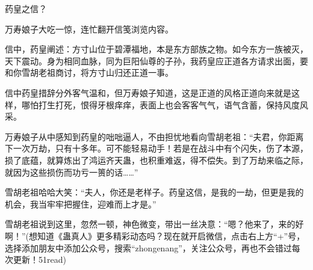 \begin{this_body}
药皇之信？

万寿娘子大吃一惊，连忙翻开信笺浏览内容。

信中，药皇阐述：方寸山位于碧潭福地，本是东方部族之物。如今东方一族被灭，天下震动。身为相同血脉，同为巨阳仙尊的子孙，我药皇应正道各方请求出面，要和你雪胡老祖商讨，将方寸山归还正道一事。

信中药皇措辞分外客气温和，但万寿娘子知道，这是正道的风格正道向来就是这样，哪怕打生打死，恨得牙根痒痒，表面上也会客客气气，语气含蓄，保持风度风采。

万寿娘子从中感知到药皇的咄咄逼人，不由担忧地看向雪胡老祖：“夫君，你距离下一次万劫，只有十多年。可不能轻易动手！若是在战斗中有个闪失，伤了本源，损了底蕴，就算炼出了鸿运齐天蛊，也积重难返，得不偿失。到了万劫来临之际，就因为这些损伤而功亏一篑的话……”

雪胡老祖哈哈大笑：“夫人，你还是老样子。药皇这信，是我的一劫，但更是我的机会，我当牢牢把握住，迎难而上才是。”

雪胡老祖说到这里，忽然一顿，神色微变，带出一丝决意：“嗯？他来了，来的好啊！”(想知道《蛊真人》更多精彩动态吗？现在就开启微信，点击右上方“+”号，选择添加朋友中添加公众号，搜索“zhongenang”，关注公众号，再也不会错过每次更新！51read)

\end{this_body}

